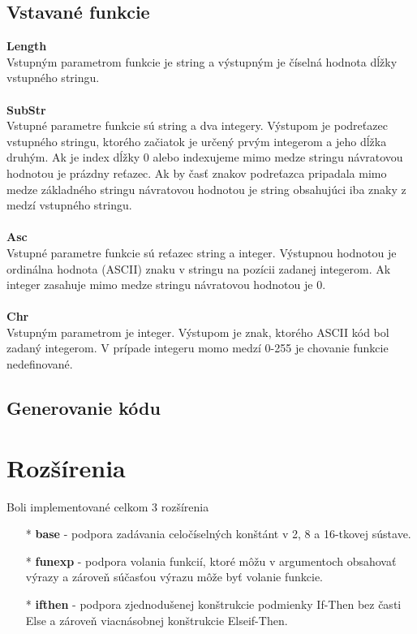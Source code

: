 \documentclass{article}
\begin{document}
        \subsection{Vstavané funkcie}
            \noindent
            \textbf{Length}\\
            Vstupným parametrom funkcie je string a výstupným je číselná hodnota dĺžky vstupného stringu.\\~\\
            \textbf{SubStr}\\
            Vstupné parametre funkcie sú string  a dva integery. Výstupom je podreťazec vstupného
            stringu, ktorého začiatok je určený prvým integerom a jeho dĺžka druhým. Ak je index dĺžky
            0 alebo indexujeme mimo medze stringu návratovou hodnotou je prázdny reťazec. Ak by časť 
            znakov podreťazca pripadala mimo medze základného stringu návratovou hodnotou je string
            obsahujúci iba znaky z medzí vstupného stringu.\\~\\
            \textbf{Asc}\\
            Vstupné parametre funkcie sú reťazec string a integer. Výstupnou hodnotou je ordinálna
            hodnota (ASCII) znaku v stringu na pozícii zadanej integerom. Ak integer zasahuje mimo 
            medze stringu návratovou hodnotou je 0.\\~\\
            \textbf{Chr}\\
            Vstupným parametrom je integer. Výstupom je znak, ktorého ASCII kód bol zadaný integerom.
            V prípade integeru momo medzí 0-255 je chovanie funkcie nedefinované.
            
        \subsection{Generovanie kódu}
        
    \section{Rozšírenia}
    Boli implementované celkom 3 rozšírenia
        \begin{itemize}
            \item[*]  \textbf{base}   - podpora zadávania celočíselných konštánt v 2, 8 a 16-tkovej sústave.
            \item[*]  \textbf{funexp} - podpora volania funkcií, ktoré môžu v argumentoch obsahovať výrazy 
                                        a zároveň súčasťou výrazu môže byť volanie funkcie.
            \item[*]  \textbf{ifthen} - podpora zjednodušenej konštrukcie podmienky If-Then bez časti Else
                                        a zároveň viacnásobnej konštrukcie Elseif-Then.
        \end{itemize}
    
\end{document}
